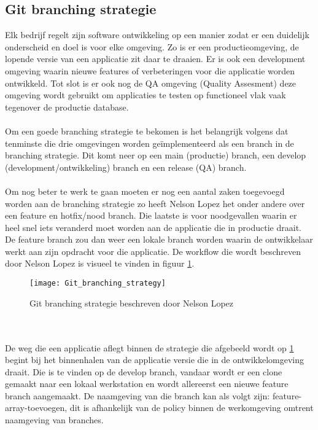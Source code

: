 \subsection{Git branching strategie}
Elk bedrijf regelt zijn software ontwikkeling op een manier zodat er een duidelijk onderscheid en doel is voor elke omgeving. Zo is er een productieomgeving, de lopende versie van een applicatie zit daar te draaien. Er is ook een development omgeving waarin nieuwe features of verbeteringen voor die applicatie worden ontwikkeld. Tot slot is er ook nog de QA omgeving (Quality Assesment) deze omgeving wordt gebruikt om applicaties te testen op functioneel vlak vaak tegenover de productie database.
\\ \\
Om een goede branching strategie te bekomen is het belangrijk volgens \textcite{Lopez2023} dat tenminste die drie omgevingen worden geïmplementeerd als een branch in de branching strategie. Dit komt neer op een main (productie) branch, een develop (development/ontwikkeling) branch en een release (QA) branch.
\\ \\
Om nog beter te werk te gaan moeten er nog een aantal zaken toegevoegd worden aan de branching strategie zo heeft Nelson Lopez het onder andere over een feature en hotfix/nood branch. Die laatste is voor noodgevallen waarin er heel snel iets veranderd moet worden aan de applicatie die in productie draait. De feature branch zou dan weer een lokale branch worden waarin de ontwikkelaar werkt aan zijn opdracht voor die applicatie. De workflow die wordt beschreven door Nelson Lopez is visueel te vinden in figuur \ref{fig:git branching strategie}.
\begin{figure}[h]
    \centering
    \texttt{[image: Git\_branching\_strategy]}
    \caption{Git branching strategie beschreven door Nelson Lopez}
    \label{fig:git branching strategie}
\end{figure}
\\ \\
De weg die een applicatie aflegt binnen de strategie die afgebeeld wordt op \ref{fig:git branching strategie} begint bij het binnenhalen van de applicatie versie die in de ontwikkelomgeving draait. Die is te vinden op de develop branch, vandaar wordt er een clone gemaakt naar een lokaal werkstation en wordt allereerst een nieuwe feature branch aangemaakt. De naamgeving van die branch kan als volgt zijn: feature-array-toevoegen, dit is afhankelijk van de policy binnen de werkomgeving omtrent naamgeving van branches.
